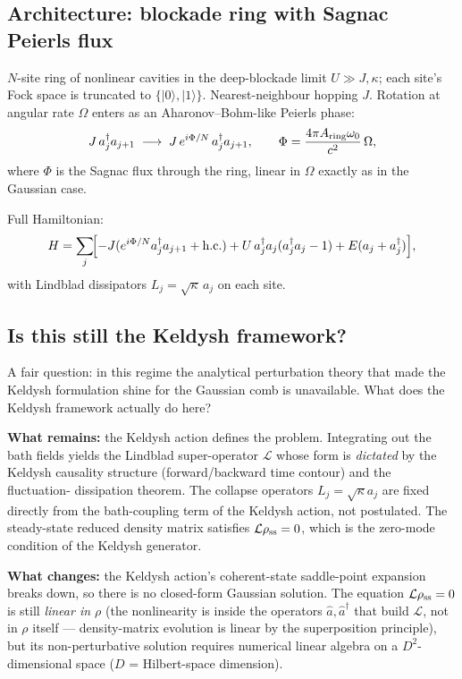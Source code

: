 \documentclass[11pt]{article}
\begin{document}
\subsection{Architecture: blockade ring with Sagnac Peierls flux}
\label{sec:blockade_arch}

$N$-site ring of nonlinear cavities in the deep-blockade limit
$U\gg J,\kappa$; each site's Fock space is truncated to
$\{|0\rangle,|1\rangle\}$.  Nearest-neighbour hopping $J$.  Rotation
at angular rate $\Omega$ enters as an Aharonov--Bohm-like Peierls
phase:
\begin{equation}
  J\,a_j^\dagger a_{j+1} \;\longrightarrow\; J\,e^{i\Phi/N}\,a_j^\dagger a_{j+1},
  \qquad \Phi = \frac{4\pi A_{\rm ring}\omega_0}{c^2}\,\Omega,
  \label{eq:peierls}
\end{equation}
where $\Phi$ is the Sagnac flux through the ring, linear in $\Omega$
exactly as in the Gaussian case.

Full Hamiltonian:
\begin{equation}
  H = \sum_j\!\Bigl[-J(e^{i\Phi/N}a_j^\dagger a_{j+1} + \mathrm{h.c.})
     + U\,a_j^\dagger a_j(a_j^\dagger a_j-1)
     + E(a_j + a_j^\dagger)\Bigr],
  \label{eq:H_blockade}
\end{equation}
with Lindblad dissipators $L_j = \sqrt\kappa\,a_j$ on each site.

\subsection{Is this still the Keldysh framework?}
\label{sec:blockade_framing}

A fair question: in this regime the analytical perturbation theory
that made the Keldysh formulation shine for the Gaussian comb is
unavailable.  What does the Keldysh framework actually do here?

\textbf{What remains:} the Keldysh action defines the problem.
Integrating out the bath fields yields the Lindblad super-operator
$\mathcal{L}$ whose form is \emph{dictated} by the Keldysh causality
structure (forward/backward time contour) and the fluctuation-
dissipation theorem.  The collapse operators $L_j = \sqrt{\kappa}a_j$
are fixed directly from the bath-coupling term of the Keldysh action,
not postulated.  The steady-state reduced density matrix satisfies
$\mathcal{L}\rho_{\rm ss} = 0$, which is the zero-mode condition of
the Keldysh generator.

\textbf{What changes:} the Keldysh action's coherent-state
saddle-point expansion breaks down, so there is no closed-form
Gaussian solution.  The equation $\mathcal{L}\rho_{\rm ss}=0$ is still
\emph{linear in $\rho$} (the nonlinearity is inside the operators
$\hat a, \hat a^\dagger$ that build $\mathcal{L}$, not in $\rho$
itself --- density-matrix evolution is linear by the superposition
principle), but its non-perturbative solution requires numerical
linear algebra on a $D^2$-dimensional space ($D$ = Hilbert-space
dimension).
\end{document}
